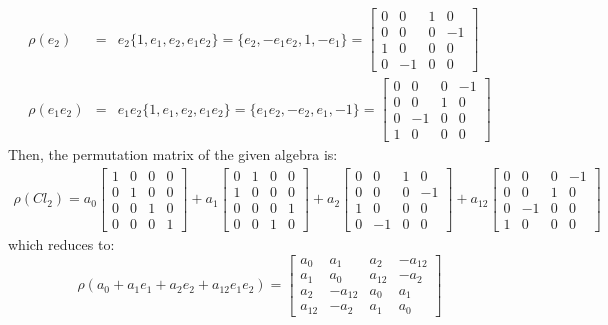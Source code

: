 \documentclass[12pt,onecolumn,letterpaper]{article} %
\begin{document}
\begin{eqnarray*}
\rho(e_2)&=&e_2\{1,e_{1},e_{2},e_{1}e_{2}\}=\{e_2,-e_1e_2,1,-e_{1}\}=\left[
\begin{array}{llll}
0 & 0 & 1 & 0 \\
0 & 0 & 0 & -1 \\
1 & 0 & 0 & 0\\
 0 & -1 & 0 & 0
\end{array} \right ]\\
\rho(e_1e_2)&=&e_1e_2\{1,e_{1},e_{2},e_{1}e_{2}\}=\{e_1e_2,-e_2,e_1,-1\}=\left[
\begin{array}{llll}
0 & 0 & 0 & -1 \\
0 & 0 & 1 & 0 \\
0 & -1 & 0 & 0\\
1 & 0 & 0 & 0
\end{array} \right ]
\end{eqnarray*}
Then, the permutation matrix of the given algebra is:
\begin{eqnarray*}
\rho(Cl_2)=a_0\left [
\begin{array}{llll}
1 & 0 & 0 & 0 \\
0 & 1 & 0 & 0 \\
0 & 0 & 1 & 0\\
 0 & 0 & 0 & 1
\end{array} \right ]+a_1\left[
\begin{array}{llll}
0 & 1 & 0 & 0 \\
1 & 0 & 0 & 0 \\
0 & 0 & 0 & 1\\
 0 & 0 & 1 & 0
\end{array} \right ]+a_2\left[
\begin{array}{llll}
0 & 0 & 1 & 0 \\
0 & 0 & 0 & -1 \\
1 & 0 & 0 & 0\\
 0 & -1 & 0 & 0
\end{array} \right ]+a_{12}\left[
\begin{array}{llll}
0 & 0 & 0 & -1 \\
0 & 0 & 1 & 0 \\
0 & -1 & 0 & 0\\
1 & 0 & 0 & 0
\end{array} \right ]
\end{eqnarray*}
which reduces to:
\begin{equation}
    \rho(a_0+a_1e_{1}+a_2e_{2}+a_{12}e_{1}e_{2})=\left[
\begin{array}{llll}
a_0 & a_1 & a_2 & -a_{12} \\
a_1 & a_0 & a_{12} & -a_2 \\
a_2 & -a_{12} & a_0 & a_1\\
 a_{12} & -a_2 & a_1 & a_0
\end{array} \right ]
\end{equation}
\end{document}
